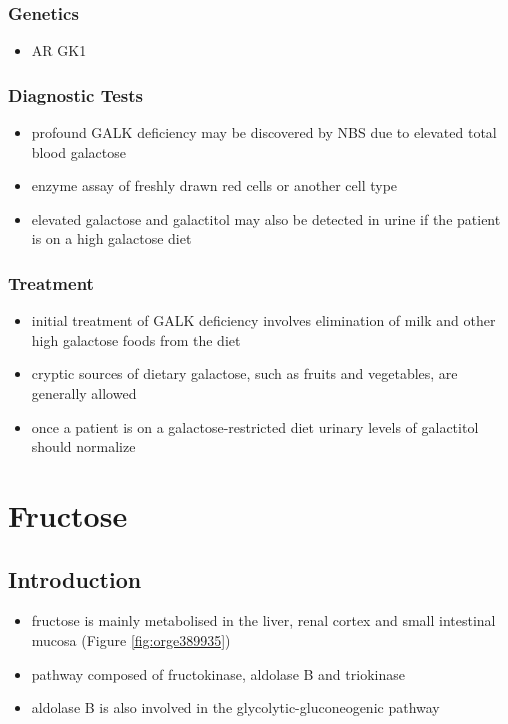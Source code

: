 \documentclass[12pt]{scrartcl}
\begin{document}
\subsubsection{Genetics}
\label{sec:org3f4d5b0}
\begin{itemize}
\item AR GK1
\end{itemize}
\subsubsection{Diagnostic Tests}
\label{sec:org0956090}
\begin{itemize}
\item profound GALK deficiency may be discovered by NBS due to elevated total blood galactose
\item enzyme assay of freshly drawn red cells or another cell type
\item elevated galactose and galactitol may also be detected in urine if
the patient is on a high galactose diet
\end{itemize}

\subsubsection{Treatment}
\label{sec:org1a67753}
\begin{itemize}
\item initial treatment of GALK deficiency involves elimination of milk
and other high galactose foods from the diet
\item cryptic sources of dietary galactose, such as fruits and vegetables,
are generally allowed
\item once a patient is on a galactose-restricted diet urinary levels of
galactitol should normalize
\end{itemize}
\section{Fructose}
\label{sec:org0c7fd2d}
\subsection{Introduction}
\label{sec:org3e27457}
\begin{itemize}
\item fructose is mainly metabolised in the liver, renal cortex and small
intestinal mucosa (Figure \ref{fig:orge389935})
\item pathway composed of fructokinase, aldolase B and triokinase
\item aldolase B is also involved in the glycolytic-gluconeogenic pathway
\end{itemize}
\end{document}
